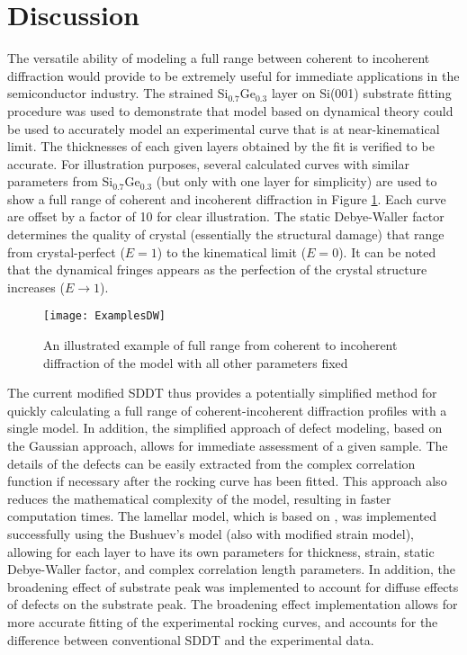 	\section{Discussion}

The versatile ability of modeling a full range between coherent to incoherent diffraction would provide to be extremely useful for immediate applications in the semiconductor industry.  The strained Si$_{0.7}$Ge$_{0.3}$ layer on Si(001) substrate fitting procedure was used to demonstrate that model based on dynamical theory could be used to accurately model an experimental curve that is at near-kinematical limit.  The thicknesses of each given layers obtained by the fit is verified to be accurate.  For illustration purposes, several calculated curves with similar parameters from Si$_{0.7}$Ge$_{0.3}$ (but only with one layer for simplicity) are used to show a full range of coherent and incoherent diffraction in Figure \ref{example}.  Each curve are offset by a factor of 10 for clear illustration.  The static Debye-Waller factor determines the quality of crystal (essentially the structural damage) that range from crystal-perfect ($E=1$) to the kinematical limit ($E=0$).  It can be noted that the dynamical fringes appears as the perfection of the crystal structure increases ($E \rightarrow 1$).
%
\begin{figure}
	\texttt{[image: ExamplesDW]}
	\caption{An illustrated example of full range from coherent to incoherent diffraction of the model with all other parameters fixed}
	\label{example}
	\end{figure}
%
The current modified SDDT thus provides a potentially simplified method for quickly calculating a full range of coherent-incoherent diffraction profiles with a single model.  In addition, the simplified approach of defect modeling, based on the Gaussian approach, allows for immediate assessment of a given sample.  The details of the defects can be easily extracted from the complex correlation function if necessary after the rocking curve has been fitted.  This approach also reduces the mathematical complexity of the model, resulting in faster computation times.  The lamellar model, which is based on \cite{Punegov15}, was implemented successfully using the Bushuev's model \cite{Bushuev1,Bushuev2} (also with modified strain model), allowing for each layer to have its own parameters for thickness, strain, static Debye-Waller factor, and complex correlation length parameters.  In addition, the broadening effect of substrate peak was implemented  to account for diffuse effects of defects on the substrate peak.  The broadening effect implementation allows for more accurate fitting of the experimental rocking curves, and accounts for the difference between conventional SDDT and the experimental data.


